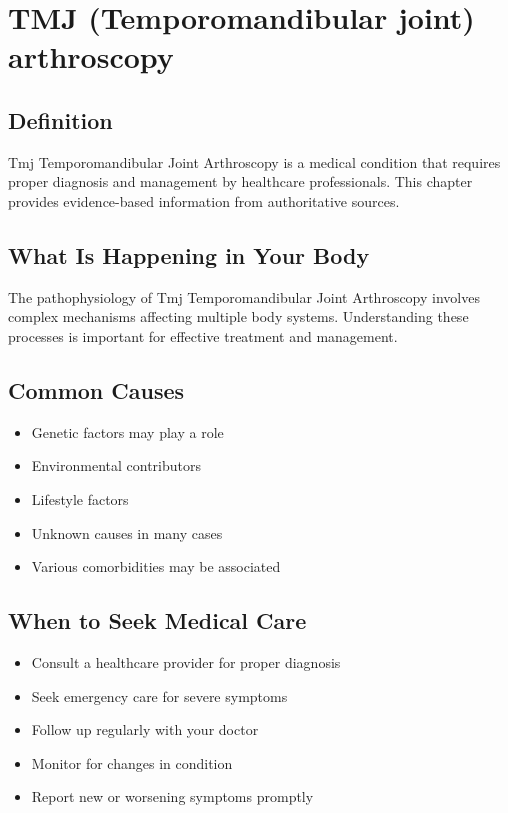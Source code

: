 
\chapter{TMJ (Temporomandibular joint) arthroscopy}

\section*{Definition}
Tmj Temporomandibular Joint Arthroscopy is a medical condition that requires proper diagnosis and management by healthcare professionals. This chapter provides evidence-based information from authoritative sources.

\section*{What Is Happening in Your Body}
The pathophysiology of Tmj Temporomandibular Joint Arthroscopy involves complex mechanisms affecting multiple body systems. Understanding these processes is important for effective treatment and management.

\section*{Common Causes}
\begin{itemize}
  \item Genetic factors may play a role
  \item Environmental contributors
  \item Lifestyle factors
  \item Unknown causes in many cases
  \item Various comorbidities may be associated
\end{itemize}

\section*{When to Seek Medical Care}
\begin{itemize}
  \item Consult a healthcare provider for proper diagnosis
  \item Seek emergency care for severe symptoms
  \item Follow up regularly with your doctor
  \item Monitor for changes in condition
  \item Report new or worsening symptoms promptly
\end{itemize}

